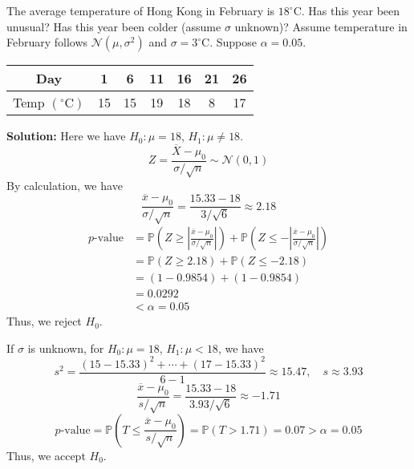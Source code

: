 \begin{eg}
  The average temperature of Hong Kong in February is \(18^\circ\text{C}\). Has this year been unusual? Has this year been colder (assume \(\sigma\) unknown)? Assume temperature in February follows \(\mathcal{N}(\mu, \sigma^2)\) and \(\sigma = 3^\circ\text{C}\). Suppose \(\alpha = 0.05\). 
  \begin{table}[H]
    \centering
    \begin{tabular}{c|c|c|c|c|c|c}
      \toprule
      Day & 1 & 6 & 11 & 16 & 21 & 26 \\
      \midrule
      Temp \((^\circ\text{C})\) & 15 & 15 & 19 & 18 & 8 & 17 \\
      \bottomrule
    \end{tabular}
  \end{table}

  \textbf{Solution:}  
  Here we have \(H_0: \mu = 18\), \(H_1: \mu \neq 18\).  
  \[
    Z = \dfrac{\overline{X} - \mu_0}{\sigma / \sqrt{n}} \sim \mathcal{N}(0, 1)
  \]
  By calculation, we have
  \[
    \dfrac{\overline{x} - \mu_0}{\sigma / \sqrt{n}} = \dfrac{15.33 - 18}{3 / \sqrt{6}} \approx 2.18
  \]
  \[
  \begin{aligned}
    p\text{-value} &= \mathbb{P}\left( Z \geq \left| \frac{\overline{x} - \mu_0}{\sigma / \sqrt{n}} \right| \right) + \mathbb{P}\left( Z \leq -\left| \frac{\overline{x} - \mu_0}{\sigma / \sqrt{n}} \right| \right) \\
    &= \mathbb{P}(Z \geq 2.18) + \mathbb{P}(Z \leq -2.18) \\
    &= (1 - 0.9854) + (1 - 0.9854) \\
    &= 0.0292 \\
    &< \alpha = 0.05
  \end{aligned}
  \]
  Thus, we reject \(H_0\).

  If \(\sigma\) is unknown, for \(H_0: \mu = 18\), \(H_1: \mu < 18\), we have
  \[
    s^2 = \dfrac{(15 - 15.33)^2 + \cdots + (17 - 15.33)^2}{6 - 1} \approx 15.47, \quad s \approx 3.93
  \]
  \[
    \dfrac{\overline{x} - \mu_0}{s / \sqrt{n}} = \dfrac{15.33 - 18}{3.93 / \sqrt{6}} \approx -1.71
  \]
  \[
    p\text{-value} = \mathbb{P}\left( T \leq \frac{\overline{x} - \mu_0}{s / \sqrt{n}} \right) = \mathbb{P} ( T > 1.71) = 0.07 > \alpha = 0.05
  \]
  Thus, we accept \(H_0\).
\end{eg}